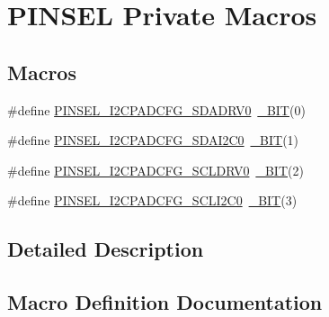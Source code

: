 \hypertarget{group___p_i_n_s_e_l___private___macros}{}\section{P\+I\+N\+S\+EL Private Macros}
\label{group___p_i_n_s_e_l___private___macros}
\subsection*{Macros}
\begin{DoxyCompactItemize}
\item 
\#define \hyperlink{group___p_i_n_s_e_l___private___macros_ga8a299707e5701134a2cb2986c3e89143}{P\+I\+N\+S\+E\+L\+\_\+\+I2\+C\+P\+A\+D\+C\+F\+G\+\_\+\+S\+D\+A\+D\+R\+V0}~\hyperlink{group___l_p_c___types___public___macros_ga7ee022f5e5a971a8324e4b7572d49170}{\+\_\+\+B\+IT}(0)
\item 
\#define \hyperlink{group___p_i_n_s_e_l___private___macros_gacf54f139b5d19b1e076d275670b8bfde}{P\+I\+N\+S\+E\+L\+\_\+\+I2\+C\+P\+A\+D\+C\+F\+G\+\_\+\+S\+D\+A\+I2\+C0}~\hyperlink{group___l_p_c___types___public___macros_ga7ee022f5e5a971a8324e4b7572d49170}{\+\_\+\+B\+IT}(1)
\item 
\#define \hyperlink{group___p_i_n_s_e_l___private___macros_ga7ee73f8fec052b869ea634112485d40b}{P\+I\+N\+S\+E\+L\+\_\+\+I2\+C\+P\+A\+D\+C\+F\+G\+\_\+\+S\+C\+L\+D\+R\+V0}~\hyperlink{group___l_p_c___types___public___macros_ga7ee022f5e5a971a8324e4b7572d49170}{\+\_\+\+B\+IT}(2)
\item 
\#define \hyperlink{group___p_i_n_s_e_l___private___macros_ga2e19e5c328764503a265fbd2c4cbb718}{P\+I\+N\+S\+E\+L\+\_\+\+I2\+C\+P\+A\+D\+C\+F\+G\+\_\+\+S\+C\+L\+I2\+C0}~\hyperlink{group___l_p_c___types___public___macros_ga7ee022f5e5a971a8324e4b7572d49170}{\+\_\+\+B\+IT}(3)
\end{DoxyCompactItemize}


\subsection{Detailed Description}


\subsection{Macro Definition Documentation}
